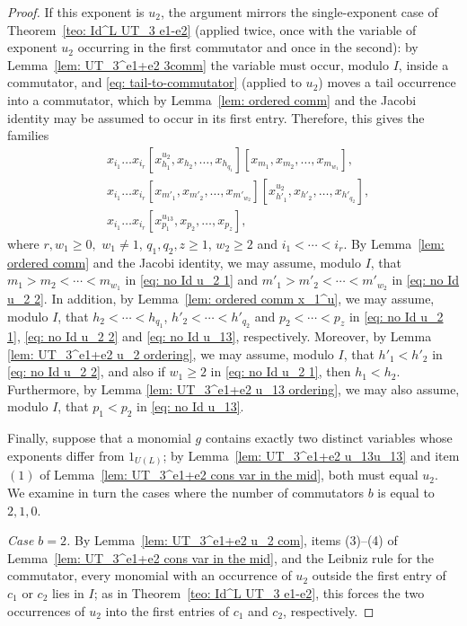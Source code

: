 \documentclass[a4paper,reqno]{amsart}
\theoremstyle{definition}
\numberwithin{equation}{section}
\numberwithin{theorem}{section}
\begin{document}
\begin{proof}
If this exponent is $u_2$, the argument mirrors the single-exponent case of Theorem~\ref{teo: Id^L UT_3 e1-e2} (applied twice, once with the variable of exponent $u_2$ occurring in the first commutator and once in the second): by Lemma~\ref{lem: UT_3^e1+e2 3comm} the variable must occur, modulo $I$, inside a commutator, and \eqref{eq: tail-to-commutator} (applied to $u_2$) moves a tail occurrence into a commutator, which by Lemma~\ref{lem: ordered comm} and the Jacobi identity may be assumed to occur in its first entry.
Therefore, this gives the families
     \begin{align}
&x_{i_{1}}\dots x_{i_{r}}[x_{h_1}^{u_{2}},x_{h_2},\dots,x_{h_{q_1}}][x_{m_1},x_{m_2},\dots,x_{m_{w_1}}],\label{eq: no Id u_2 1}\\
&x_{i_{1}}\dots x_{i_{r}}[x_{m'_1},x_{m'_2},\dots,x_{m'_{w_2}}][x_{h'_1}^{u_{2}},x_{h'_2},\dots,x_{h'_{q_2}}], \label{eq: no Id u_2 2}\\
&x_{i_{1}}\dots x_{i_{r}}[x_{p_1}^{u_{13}},x_{p_2},\dots,x_{p_z}], \label{eq: no Id u_13} 
\end{align}
where $r, w_1 \geq 0,$ $w_1\neq 1$, $q_1,q_2,z\geq 1$, $w_2\geq 2$ and  $i_1< \cdots < i_r$.
By Lemma~\ref{lem: ordered comm} and the Jacobi identity, we may assume, modulo $I$, that $m_1>m_2< \cdots < m_{w_1}$ in \eqref{eq: no Id u_2 1} and $m'_1>m'_2< \cdots < m'_{w_2}$ in \eqref{eq: no Id u_2 2}.
 In addition, by Lemma~\ref{lem: ordered comm x_1^u}, we may assume, modulo $I$, that $h_2< \cdots <h_{q_1}$, $h'_2< \cdots <h'_{q_2}$ and $p_2<\cdots <p_z$ in \eqref{eq: no Id u_2 1}, \eqref{eq: no Id u_2 2} and \eqref{eq: no Id u_13}, respectively.  Moreover, by Lemma \ref{lem: UT_3^e1+e2 u_2 ordering}, we may assume, modulo $I$, that $h'_1<h'_2$ in \eqref{eq: no Id u_2 2}, and also if $w_1\geq 2$ in \eqref{eq: no Id u_2 1}, then $h_1<h_2$. Furthermore, by Lemma \ref{lem: UT_3^e1+e2 u_13 ordering}, we may also assume, modulo $I$, that $p_1<p_2$ in \eqref{eq: no Id u_13}.

Finally, suppose that a monomial $g$ contains exactly two distinct variables whose exponents differ from $1_{U(L)}$; by Lemma~\ref{lem: UT_3^e1+e2 u_13u_13} and item $(1)$ of Lemma~\ref{lem: UT_3^e1+e2 cons var in the mid}, both must equal $u_2$. We examine  in turn the cases where the number of commutators $b$ is equal to
$2, 1, 0$.

 \smallskip

\emph{Case $b=2$.} By Lemma~\ref{lem: UT_3^e1+e2 u_2 com}, items (3)--(4) of Lemma~\ref{lem: UT_3^e1+e2 cons var in the mid}, and the Leibniz rule for the commutator, every monomial with an occurrence of $u_2$ outside the first entry of $c_1$ or $c_2$ lies in $I$; as in Theorem~\ref{teo: Id^L UT_3 e1-e2}, this forces the two occurrences of $u_2$ into the first entries of $c_1$ and $c_2$, respectively.


\end{proof}
\end{document}
